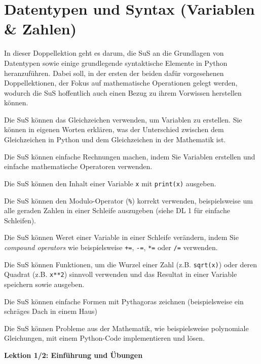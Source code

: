 \section{Datentypen und Syntax (Variablen \& Zahlen)}
\begin{myExBox}
	In dieser Doppellektion geht es darum, die SuS an die Grundlagen von Datentypen sowie einige grundlegende syntaktische Elemente in Python heranzuführen. Dabei soll, in der ersten der beiden dafür vorgesehenen Doppellektionen, der Fokus auf mathematische Operationen gelegt werden, wodurch die SuS hoffentlich auch einen Bezug zu ihrem Vorwissen herstellen können.

	\begin{todolist}
		\item Die SuS können das Gleichzeichen verwenden, um Variablen zu erstellen. Sie können in eigenen Worten erklären, was der Unterschied zwischen dem Gleichzeichen in Python und dem Gleichzeichen in der Mathematik ist.
		\item Die SuS können einfache Rechnungen machen, indem Sie Variablen erstellen und einfache mathematische Operatoren verwenden.
		\item Die SuS können den Inhalt einer Variable \lstinline|x| mit \lstinline|print(x)| ausgeben.
		\item Die SuS können den Modulo-Operator (\texttt{\%}) korrekt verwenden, beispielsweise um alle geraden Zahlen in einer Schleife auszugeben  (siehe DL 1 für einfache Schleifen).
		\item Die SuS können Weret einer Variable in einer Schleife verändern, indem Sie \textit{compound operators} wie beispielsweise \lstinline|+=|, \lstinline|-=|, \lstinline|*=| oder \lstinline|/=| verwenden.
		\item Die SuS können Funktionen, um die Wurzel einer Zahl (z.B. \lstinline|sqrt(x)|) oder deren Quadrat (z.B. \lstinline|x**2|) sinnvoll verwenden und das Resultat in einer Variable speichern sowie ausgeben.
		\item Die SuS können einfache Formen mit Pythagoras zeichnen (beispielsweise ein schräges Dach in einem Haus)
		\item Die SuS können Probleme aus der Mathematik, wie beispielsweise polynomiale Gleichungen, mit einem Python-Code implementieren und lösen.
	\end{todolist}

	\textbf{Lektion 1/2: Einführung und Übungen}


\end{myExBox}
